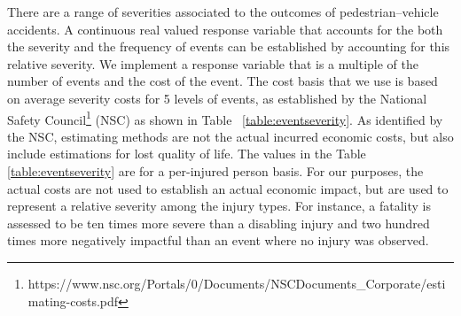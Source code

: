 \documentclass{llncs}
\begin{document}
There are a range of severities associated to the outcomes of pedestrian--vehicle accidents. A continuous real valued response variable that accounts for the both the severity and the frequency of events can be established by accounting for this relative severity. We implement a response variable that is a multiple of the number of events and the cost of the event. The cost basis that we use is based on average severity costs for 5 levels of events, as established by the National Safety Council\footnote{https://www.nsc.org/Portals/0/Documents/NSCDocuments_Corporate/estimating-costs.pdf} (NSC) as shown in Table ~\ref{table:eventseverity}. As identified by the NSC, estimating methods are not the actual incurred economic costs, but also include estimations for lost quality of life. The values in the Table \ref{table:eventseverity} are for a per-injured person basis. For our purposes, the actual costs are not used to establish an actual economic impact, but are used to represent a relative severity among the injury types. For instance, a fatality is assessed to be ten times more severe than a disabling injury and two hundred times more negatively impactful than an event where no injury was observed.
\end{document}
